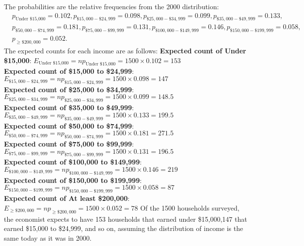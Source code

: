 \documentclass{report}
\begin{document}
\begin{mdframed}
      \bigbreak \noindent 
      The probabilities are the relative frequencies from the 2000 distribution:
      \begin{align*}
              & p_{\text{Under \$15,000}} = 0.102,
    p_{\$15,000 - \$24,999} = 0.098,
    p_{\$25,000 - \$34,999} = 0.099,
          p_{\$35,000 - \$49,999} = 0.133, \\&
    p_{\$50,000 - \$74,999} = 0.181,
    p_{\$75,000 - \$99,999} = 0.131,
    p_{\$100,000 - \$149,999} = 0.146,
          p_{\$150,000 - \$199,999} = 0.058, \\&
    p_{\geq \$200,000} = 0.052
      .\end{align*}
      \bigbreak \noindent 
      The expected counts for each income are as follows:
      \bigbreak \noindent 
      \textbf{Expected count of Under \$15,000}: \(E_{\text{Under \$15,000}} = np_{\text{Under \$15,000}} = 1500 \times 0.102 = 153\) \\
        \textbf{Expected count of \$15,000 to \$24,999}: \(E_{\$15,000 - \$24,999} = np_{\$15,000 - \$24,999} = 1500 \times 0.098 = 147\) \\
        \textbf{Expected count of \$25,000 to \$34,999}: \(E_{\$25,000 - \$34,999} = np_{\$25,000 - \$34,999} = 1500 \times 0.099 = 148.5\) \\
        \textbf{Expected count of \$35,000 to \$49,999}: \(E_{\$35,000 - \$49,999} = np_{\$35,000 - \$49,999} = 1500 \times 0.133 = 199.5\) \\
        \textbf{Expected count of \$50,000 to \$74,999}: \(E_{\$50,000 - \$74,999} = np_{\$50,000 - \$74,999} = 1500 \times 0.181 = 271.5\) \\
        \textbf{Expected count of \$75,000 to \$99,999}: \(E_{\$75,000 - \$99,999} = np_{\$75,000 - \$99,999} = 1500 \times 0.131 = 196.5\) \\
        \textbf{Expected count of \$100,000 to \$149,999}: \(E_{\$100,000 - \$149,999} = np_{\$100,000 - \$149,999} = 1500 \times 0.146 = 219\) \\
        \textbf{Expected count of \$150,000 to \$199,999}: \(E_{\$150,000 - \$199,999} = np_{\$150,000 - \$199,999} = 1500 \times 0.058 = 87\) \\
        \textbf{Expected count of At least \$200,000}: \(E_{\geq \$200,000} = np_{\geq \$200,000} = 1500 \times 0.052 = 78\)
        \bigbreak \noindent 
        Of the 1500 households surveyed, the economist expects to have 153 households that earned under \$15,000,147 that earned \$15,000 to \$24,999, and so on, assuming the distribution of income is the same today as it was in 2000.
    \end{mdframed}
\end{document}
